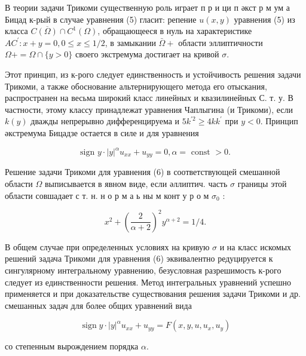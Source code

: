 \documentclass[10pt]{article}
\begin{document}
В теории задачи Трикоми существенную роль играет п р и ци п әкст р м ум а Бицад к-рый в случае уравнения (5) гласит: репение $u(x, y)$ уравнения (5) из класса $C \overline{(\Omega)} \cap C^{1}(\Omega)$, обращающееся в нуль на характеристике $A C^{\prime}: x+y=0,0 \leqslant x \leqslant 1 / 2$, в замыкании $\bar{\Omega}+$ области эллиптичности $\Omega+=\Omega \cap\{y>0\}$ своего экстремума достигает на кривой $\sigma$.



Этот принцип, из к-рого следует единственность и устойчивость решения задачи Трикоми, а также обоснование альтернирующего метода его отыскания, распространен на весьма широкий класс линейных и квазилинейных С. т. у. В частности, этому классу принадлежат уравнения Чаплыгина (и Трикоми), если $k(y)$ дважды непрерывно дифференцируема и $5 k^{\prime 2} \geqslant 4 k k^{\prime}$ при $y<0$. Принцип әкстремума Бицадзе остается в силе и для уравнения



\[

\text { sign } y \cdot|y|^{\alpha} u_{x x}+u_{y y}=0, \alpha=\text { const }>0 \text {. }

\]



Решение задачи Трикоми для уравнения (6) в соответствующей смешанной области $\Omega$ выписывается в явном виде, если әллиптич. часть $\sigma$ границы этой области совшадает с т. н. н о р м а ь ны м конт у р о м $\sigma_{0}$ :



\[

x^{2}+\left(\frac{2}{\alpha+2}\right)^{2} y^{\alpha+2}=1 / 4 .

\]



В общем случае при определенных условиях на кривую $\sigma$ и на класс искомых решений задача Трикоми для уравнения (6) эквивалентно редуцируется к сингулярному интегральному уравнению, безусловная разрешимость к-рого следует из единственности решения. Метод интегральных уравнений успешно применяется и при доказательстве существования решения задачи Трикоми и др. смешанных задач для более общих уравнений вида



\[

\operatorname{sign} y \cdot|y|^{\alpha} u_{x x}+u_{y y}=F\left(x, y, u, u_{x}, u_{y}\right)

\]



со степенным вырождением порядка $\alpha$.
\end{document}
